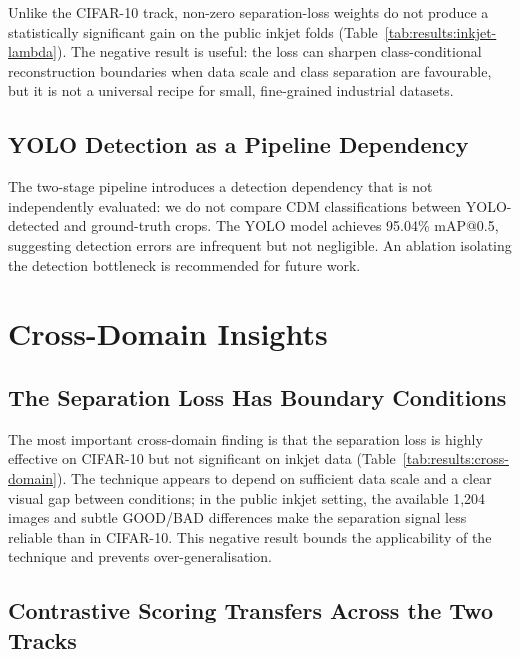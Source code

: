 Unlike the CIFAR-10 track, non-zero separation-loss weights do not
produce a statistically significant gain on the public inkjet folds
(Table~\ref{tab:results:inkjet-lambda}). The negative result is useful:
the loss can sharpen class-conditional reconstruction boundaries when
data scale and class separation are favourable, but it is not a universal
recipe for small, fine-grained industrial datasets.

\subsection{YOLO Detection as a Pipeline Dependency}
\label{sec:disc:inkjet:yolo}

The two-stage pipeline introduces a detection dependency that is not
independently evaluated: we do not compare CDM classifications between
YOLO-detected and ground-truth crops. The YOLO model achieves 95.04\%
mAP@0.5, suggesting detection errors are infrequent but not negligible.
An ablation isolating the detection bottleneck is recommended for future
work.

\section{Cross-Domain Insights}
\label{sec:disc:cross}

\subsection{The Separation Loss Has Boundary Conditions}
\label{sec:disc:cross:separation}

The most important cross-domain finding is that the separation loss is
highly effective on CIFAR-10 but not significant on inkjet data
(Table~\ref{tab:results:cross-domain}).
The technique appears to depend on sufficient data scale and a clear
visual gap between conditions; in the public inkjet setting, the
available 1{,}204 images and subtle GOOD/BAD differences make the
separation signal less reliable than in CIFAR-10. This negative result
bounds the applicability of the technique and prevents
over-generalisation.

\subsection{Contrastive Scoring Transfers Across the Two Tracks}
\label{sec:disc:cross:contrastive}

